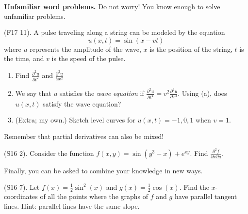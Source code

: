 \documentclass[12pt, a4paper]{article}
\begin{document}
\textbf{Unfamiliar word problems.} Do not worry! You know enough to
solve unfamiliar problems.
\begin{ex}
  (F17 11). A pulse traveling along a string can be modeled by the
  equation \[
    u(x,t) = \sin(x-vt)
  \]
  where \(u\) represents the amplitude of the wave, \(x\) is the
  position of the string, \(t\) is the time, and \(v\) is the speed of
  the pulse.
  \begin{enumerate}
  \item Find \(\frac{\partial^2 u}{\partial t^2}\) and
    \(\frac{\partial^2 u}{\partial x^2}\)
  \item We say that \(u\) satisfies the \emph{wave equation} if
    \(\frac{\partial^2 u}{\partial t^2} = v^2 \frac{\partial^2
      u}{\partial x^2}\). Using (a), does \(u(x,t)\) satisfy the wave
    equation?
  \item (Extra; my own.) Sketch level curves for \(u(x,t) = -1, 0, 1\)
    when \(v=1\).
  \end{enumerate}
\end{ex}
Remember that partial derivatives can also be mixed!
\begin{ex}
  (S16 2). Consider the function \(f(x,y) = \sin(y^3-x)+e^{xy}\). Find
  \(\frac{\partial^2 f}{\partial x \partial y}\).
\end{ex}
Finally, you can be asked to combine your knowledge in new ways.
\begin{ex}
  (S16 7). Let \(f(x) = \frac{1}{2} \sin^2(x)\) and \(g(x) =
  \frac{1}{2}\cos(x)\). Find the \(x\)-coordinates of all the points
  where the graphs of \(f\) and \(g\) have parallel tangent
  lines. Hint: parallel lines have the same slope.
\end{ex}
\end{document}
